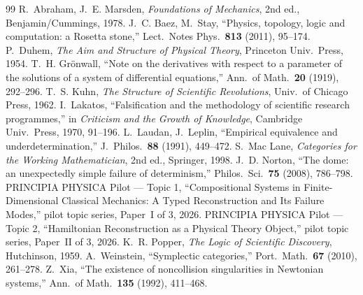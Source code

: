 \documentclass[12pt,a4paper]{article}
\theoremstyle{definition}
\theoremstyle{plain}
\theoremstyle{commentary}
\begin{document}
{\footnotesize
\begin{thebibliography}{99}
\setlength{\itemsep}{0pt}\setlength{\parskip}{0pt}
 R.~Abraham, J.~E. Marsden, \emph{Foundations of Mechanics}, 2nd ed., Benjamin/Cummings, 1978.
 J.~C. Baez, M.~Stay, ``Physics, topology, logic and computation: a Rosetta stone,'' Lect.\ Notes Phys.\ \textbf{813} (2011), 95--174.
 P.~Duhem, \emph{The Aim and Structure of Physical Theory}, Princeton Univ.\ Press, 1954.
 T.~H. Gr\"onwall, ``Note on the derivatives with respect to a parameter of the solutions of a system of differential equations,'' Ann.\ of Math.\ \textbf{20} (1919), 292--296.
 T.~S. Kuhn, \emph{The Structure of Scientific Revolutions}, Univ.\ of Chicago Press, 1962.
 I.~Lakatos, ``Falsification and the methodology of scientific research programmes,'' in \emph{Criticism and the Growth of Knowledge}, Cambridge Univ.\ Press, 1970, 91--196.
 L.~Laudan, J.~Leplin, ``Empirical equivalence and underdetermination,'' J.~Philos.\ \textbf{88} (1991), 449--472.
 S.~Mac Lane, \emph{Categories for the Working Mathematician}, 2nd ed., Springer, 1998.
 J.~D. Norton, ``The dome: an unexpectedly simple failure of determinism,'' Philos.\ Sci.\ \textbf{75} (2008), 786--798.
 PRINCIPIA PHYSICA Pilot --- Topic 1, ``Compositional Systems in Finite-Dimensional Classical Mechanics: A Typed Reconstruction and Its Failure Modes,'' pilot topic series, Paper~I of 3, 2026.
 PRINCIPIA PHYSICA Pilot --- Topic 2, ``Hamiltonian Reconstruction as a Physical Theory Object,'' pilot topic series, Paper~II of 3, 2026.
 K.~R. Popper, \emph{The Logic of Scientific Discovery}, Hutchinson, 1959.
 A.~Weinstein, ``Symplectic categories,'' Port.\ Math.\ \textbf{67} (2010), 261--278.
 Z.~Xia, ``The existence of noncollision singularities in Newtonian systems,'' Ann.\ of Math.\ \textbf{135} (1992), 411--468.
\end{thebibliography}
}
\end{document}
